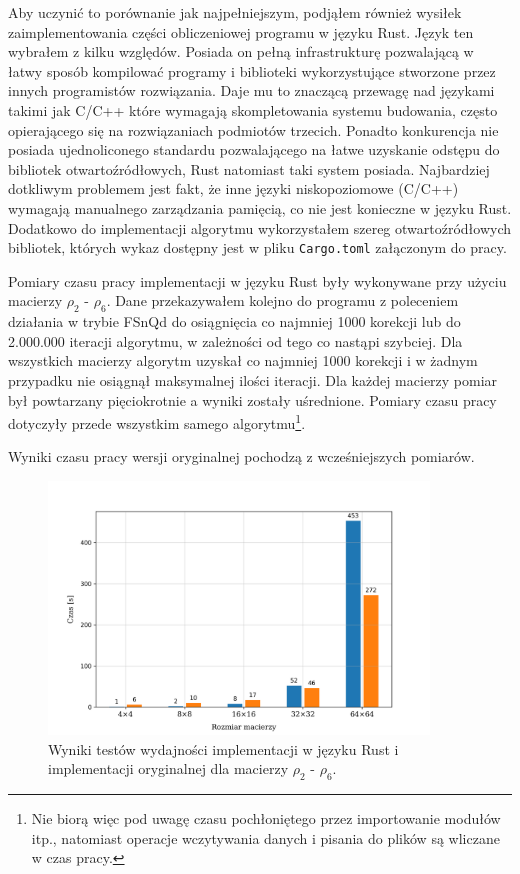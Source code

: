 \documentclass[10pt, a4paper]{article}
\newcommand{\code}[1]{\texttt{#1}}
\begin{document}
\begin{sloppypar}
    Aby uczynić to porównanie jak najpełniejszym, podjąłem również wysiłek zaimplementowania
    części obliczeniowej programu w języku Rust. Język ten wybrałem z kilku względów. Posiada
    on pełną infrastrukturę pozwalającą w łatwy sposób kompilować programy i biblioteki wykorzystujące
    stworzone przez innych programistów rozwiązania. Daje mu to znaczącą przewagę nad
    językami takimi jak C/C++ które wymagają skompletowania systemu budowania, często opierającego
    się na rozwiązaniach podmiotów trzecich. Ponadto konkurencja nie posiada
    ujednoliconego standardu pozwalającego na łatwe uzyskanie odstępu do bibliotek
    otwartoźródłowych, Rust natomiast taki system posiada. Najbardziej dotkliwym
    problemem jest fakt, że inne języki niskopoziomowe (C/C++) wymagają manualnego zarządzania
    pamięcią, co nie jest konieczne w języku Rust. Dodatkowo do implementacji algorytmu wykorzystałem
    szereg otwartoźródłowych bibliotek, których wykaz dostępny jest w pliku \code{Cargo.toml}
    załączonym do pracy.

    Pomiary czasu pracy implementacji w języku Rust były wykonywane przy użyciu macierzy
    $\rho_{2}$ - $\rho_{6}$. Dane przekazywałem kolejno do programu z poleceniem
    działania w trybie FSnQd do osiągnięcia co najmniej 1000 korekcji lub do 2.000.000 iteracji
    algorytmu, w zależności od tego co nastąpi szybciej. Dla wszystkich macierzy algorytm
    uzyskał co najmniej 1000 korekcji i w żadnym przypadku nie osiągnął maksymalnej ilości
    iteracji. Dla każdej macierzy pomiar był powtarzany pięciokrotnie a wyniki zostały
    uśrednione. Pomiary czasu pracy dotyczyły przede wszystkim samego algorytmu\footnote{Nie
    biorą więc pod uwagę czasu pochłoniętego przez importowanie modułów itp., natomiast
    operacje wczytywania danych i pisania do plików są wliczane w czas pracy.}.

    Wyniki czasu pracy wersji oryginalnej pochodzą z wcześniejszych pomiarów.

    \FloatBarrier
    \begin{figure}[ht]
      \centering
      \includegraphics[width=0.9\textwidth]{"resources/benchmark_5/plot.png"}
      \caption{Wyniki testów wydajności implementacji w języku Rust i implementacji oryginalnej dla macierzy $\rho
      _{2}$ - $\rho_{6}$.}
      \label{fourth-perf}
    \end{figure}
    \FloatBarrier


\end{sloppypar}
\end{document}
